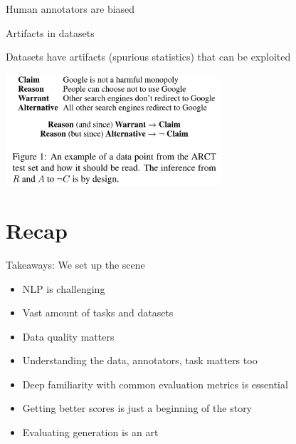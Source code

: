 \documentclass[12pt,aspectratio=169,handout]{beamer}
\begin{document}
\begin{frame}{ Human annotators are biased}
\end{frame} \begin{frame}{Artifacts in datasets}

Datasets have artifacts (spurious statistics) that can be exploited

\includegraphics[width=8cm]{img/arct.png}





\end{frame}


\section*{Recap}

\begin{frame}{Takeaways: We set up the scene}
	
\begin{itemize}
	\item NLP is challenging
	\item Vast amount of tasks and datasets
	\item Data quality matters
	\item Understanding the data, annotators, task matters too
	\item Deep familiarity with common evaluation metrics is essential
	\item Getting better scores is just a beginning of the story
	\item Evaluating generation is an art
\end{itemize}
	
\end{frame}
\end{document}
